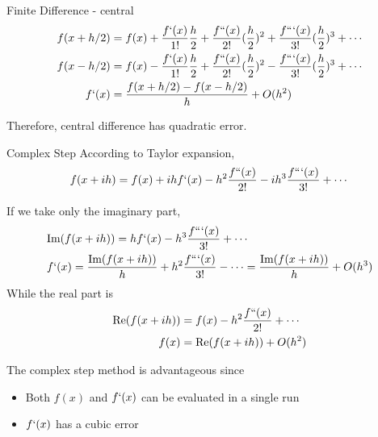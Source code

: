 \documentclass{beamer}
\begin{document}
\begin{frame}{Finite Difference - central}
\begin{equation*}
\begin{split}
    f(x+h/2) &= f(x) + \frac{f`(x)}{1!}\frac{h}{2} + \frac{f``(x)}{2!}(\frac{h}{2})^2 + \frac{f```(x)}{3!}(\frac{h}{2})^3 + \cdots \\
    f(x-h/2) &= f(x) - \frac{f`(x)}{1!}\frac{h}{2} + \frac{f``(x)}{2!}(\frac{h}{2})^2 - \frac{f```(x)}{3!}(\frac{h}{2})^3 + \cdots \\
    f`(x) &= \frac{f(x+h/2) - f(x-h/2)}{h} + O(h^2)       
\end{split}
\end{equation*}

Therefore, central difference has quadratic error.

\end{frame}

\begin{frame}{Complex Step}
According to Taylor expansion,
\begin{equation*}
    f(x+ih) = f(x) + ihf`(x) - h^2\frac{f``(x)}{2!} - ih^3\frac{f```(x)}{3!} + \cdots 
\end{equation*}

If we take only the imaginary part,
\begin{equation*}
\begin{split}
    &\textrm{Im} (f(x+ih)) = hf`(x) -  h^3\frac{f```(x)}{3!} + \cdots \\
    &f`(x) = \frac{\textrm{Im}(f(x+ih))}{h} + h^2\frac{f```(x)}{3!} - \cdots = \frac{\textrm{Im}(f(x+ih))}{h} + O(h^3)      
\end{split}
\end{equation*}
While the real part is
\begin{equation*}
\begin{split}
		\textrm{Re}(f(x+ih)) &= f(x) - h^2\frac{f``(x)}{2!} + \cdots \\
		f(x) &= \textrm{Re}(f(x+ih)) + O(h^2)
\end{split}    
\end{equation*}

The complex step method is advantageous since 

\begin{itemize}
    \item Both $f(x)$ and $f`(x)$ can be evaluated in a single run
    \item $f`(x)$ has a cubic error
\end{itemize}

\end{frame}
\end{document}
